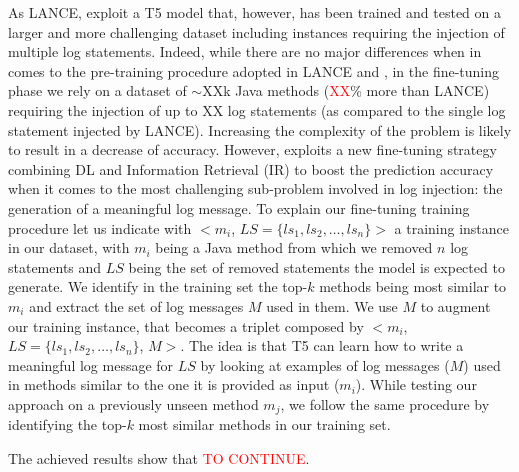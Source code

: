 As LANCE, \approach exploit a T5 model that, however, has been trained and tested on a larger and more challenging dataset including instances requiring the injection of multiple log statements. Indeed, while there are no major differences when in comes to the pre-training procedure adopted in LANCE and \approach, in the fine-tuning phase we rely on a dataset of $\sim$XXk Java methods (\textcolor{red}{XX}\% more than LANCE) requiring the injection of up to XX log statements (as compared to the single log statement injected by LANCE). Increasing the complexity of the problem is likely to result in a decrease of accuracy. However, \approach exploits a new fine-tuning strategy combining DL and Information Retrieval (IR) to boost the prediction accuracy when it comes to the most challenging sub-problem involved in log injection: the generation of a meaningful log message. To explain our fine-tuning training procedure let us indicate with $<$$m_i$, $LS=\{ls_1, ls_2, \dots, ls_n\}$$>$ a training instance in our dataset, with $m_i$ being a Java method from which we removed $n$ log statements and $LS$ being the set of removed statements the model is expected to generate. We identify in the training set the top-$k$ methods being most similar to $m_i$ and extract the set of log messages $M$ used in them. We use $M$ to augment our training instance, that becomes a triplet composed by $<$$m_i$, $LS=\{ls_1, ls_2, \dots, ls_n\}$, $M$$>$. The idea is that T5 can learn how to write a meaningful log message for $LS$ by looking at examples of log messages ($M$) used in methods similar to the one it is provided as input ($m_i$). While testing our approach on a previously unseen method $m_j$, we follow the same procedure by identifying the top-$k$ most similar methods in our training set.


The achieved results show that \textcolor{red}{TO CONTINUE}.